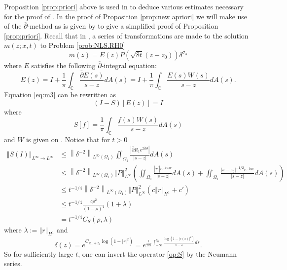 \documentclass{amsart}
\theoremstyle{plain}
\theoremstyle{remark}
\numberwithin{equation}{section}
\newcommand{\norm}[2]{\left\Vert #1\right\Vert_{#2}}
\newcommand{\dbar}{\overline{\partial}}
\begin{document}
Proposition \ref{prop:priori} above is used in \cite{DZ-2} to deduce various estimates necessary for the proof of \cite[Propsition 2.47]{DZ-2}. In the proof of Proposition \ref{prop:new apriori} we will make use of the $\overline{\partial}$-method as is given by \cite{DMM} to give a simplified proof of Proposition \ref{prop:priori}. Recall that
in \cite{DMM}, a series of transformations are made to the solution $m(z; x, t)$ to Problem \ref{prob:NLS.RH0}
\begin{equation}
\label{m:trans}
    m(z)=E(z)P(\sqrt{8t}(z-z_0))\delta^{\sigma_3}
\end{equation}
where $E$ satisfies the following $\dbar$-integral equation:
\begin{equation}
\label{eq:m3}
    E(z)=I+\frac{1}{\pi} \int_{\mathbb{C}} \frac{\bar{\partial} E(s)}{s-z} d A(s)=I+\frac{1}{\pi} \int_{\mathbb{C}} \frac{E(s) W(s)}{s-z} d A(s).
\end{equation}
Equation \eqref{eq:m3} can be rewritten as 
\begin{equation}
    (I-S)\left[E(z)\right]=I
\end{equation}
where
\begin{equation}
\label{op:S}
    S[f]=\frac{1}{\pi} \int_{\mathbb{C}} \frac{f(s) W(s)}{s-z} d A(s)
\end{equation}
and $W$ is given on \cite[P.10]{DMM18}. Notice that for $t>0$
\begin{align}
   \norm{ S(I)}{L^{\infty} \rightarrow L^{\infty}}  & \leq \left\|\delta^{-2}\right\|_{L^{\infty}\left(\Omega_1\right)} \iint_{\Omega_1} \frac{\left|\bar{\partial} R_1 e^{2 i t \theta}\right|}{|s-z|} d A(s) \\
    \nonumber
    &\leq \left\|\delta^{-2}\right\|_{L^{\infty}\left(\Omega_1\right)}\norm{P}{L^\infty}^2
    \left( \iint_{\Omega_1} \frac{\left|r^{\prime}\right| e^{-t w w}}{|s-z|} d A(s) + \iint_{\Omega_1} \frac{\left|s-z_0\right|^{-1 / 2} e^{-t u v}}{|s-z|} d A(s) \right)\\
    \nonumber
    &\leq t^{-1/4}\left\|\delta^{-2}\right\|_{L^{\infty}\left(\Omega_1\right)}\norm{P}{L^\infty}^2
    \left( c\norm{r}{H^1} +c'\right)\\
    \nonumber
    &\leq  t^{-1/4}\frac{c\rho^2}{(1-\rho)^4}(1+\lambda)\\
    \nonumber
    &=t^{-1/4}C_S(\rho, \lambda)
\end{align}
where $\lambda:=\norm{r}{H^1}$ and 
\begin{equation}
    \delta(z)=e^{C_{\mathbb{R}_{-}+z_0} \log \left(1-|r|^2\right)}=e^{\frac{1}{2 \pi i} \int_{-\infty}^{z_0} \frac{\log \left(1-|r(s)|^2\right)}{s-z} d s}.
\end{equation}
So for sufficiently large $t$, one can  invert the operator \eqref{op:S} by the Neumann series.
\end{document}
